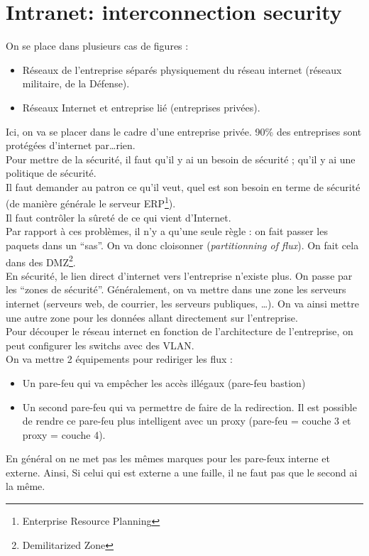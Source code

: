 \section{Intranet: interconnection security}
On se place dans plusieurs cas de figures : 
\begin{itemize}
 \item Réseaux de l'entreprise séparés physiquement du réseau internet (réseaux militaire, de la Défense).
 \item Réseaux Internet et entreprise lié (entreprises privées).
\end{itemize}
Ici, on va se placer dans le cadre d'une entreprise privée. 90\% des entreprises sont protégées d'internet par\ldots rien.\\
Pour mettre de la sécurité, il faut qu'il y ai un besoin de sécurité ; qu'il y ai une politique de sécurité.\\
Il faut demander au patron ce qu'il veut, quel est son besoin en terme de sécurité (de manière générale le serveur ERP\footnote{Enterprise Resource Planning}).\\
Il faut contrôler la sûreté de ce qui vient d'Internet.\\
Par rapport à ces problèmes, il n'y a qu'une seule règle : on fait passer les paquets dans un \enquote{sas}. On va donc cloisonner (\textit{partitionning of flux}). On fait cela dans des DMZ\footnote{Demilitarized Zone}.\\
En sécurité, le lien direct d'internet vers l'entreprise n'existe plus. On passe par les \enquote{zones de sécurité}. Généralement, on va mettre dans une zone les serveurs internet (serveurs web, de courrier, les serveurs publiques, \ldots). On va ainsi mettre une autre zone pour les données allant directement sur l'entreprise.\\
Pour découper le réseau internet en fonction de l'architecture de l'entreprise, on peut configurer les switchs avec des VLAN.\\
On va mettre 2 équipements pour rediriger les flux :
\begin{itemize}
 \item Un pare-feu qui va empêcher les accès illégaux (pare-feu bastion)
 \item Un second pare-feu qui va permettre de faire de la redirection. Il est possible de rendre ce pare-feu plus intelligent avec un proxy (pare-feu = couche 3 et proxy = couche 4).
\end{itemize}
En général on ne met pas les mêmes marques pour les pare-feux interne et externe. Ainsi, Si celui qui est externe a une faille, il ne faut pas que le second ai la même.\\

